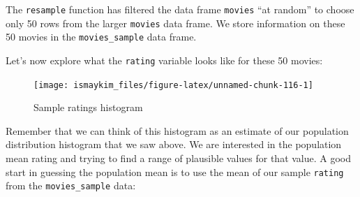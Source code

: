\documentclass[]{tufte-book}
\newenvironment{Shaded}{\begin{snugshade}}{\end{snugshade}}
\newcommand{\KeywordTok}[1]{\textcolor[rgb]{0.13,0.29,0.53}{\textbf{{#1}}}}
\newcommand{\DataTypeTok}[1]{\textcolor[rgb]{0.13,0.29,0.53}{{#1}}}
\newcommand{\DecValTok}[1]{\textcolor[rgb]{0.00,0.00,0.81}{{#1}}}
\newcommand{\StringTok}[1]{\textcolor[rgb]{0.31,0.60,0.02}{{#1}}}
\newcommand{\OtherTok}[1]{\textcolor[rgb]{0.56,0.35,0.01}{{#1}}}
\newcommand{\NormalTok}[1]{{#1}}
\begin{document}
\begin{Shaded}
\end{Shaded}

The \texttt{resample} function has filtered the data frame
\texttt{movies} ``at random'' to choose only 50 rows from the larger
\texttt{movies} data frame. We store information on these 50 movies in
the \texttt{movies\_sample} data frame.

Let's now explore what the \texttt{rating} variable looks like for these
50 movies:

\begin{Shaded}
\end{Shaded}

\begin{figure}

{\centering \texttt{[image: ismaykim\_files/figure-latex/unnamed-chunk-116-1]} 

}

\caption[Sample ratings histogram]{Sample ratings histogram}\label{fig:unnamed-chunk-116}
\end{figure}

Remember that we can think of this histogram as an estimate of our
population distribution histogram that we saw above. We are interested
in the population mean rating and trying to find a range of plausible
values for that value. A good start in guessing the population mean is
to use the mean of our sample \texttt{rating} from the
\texttt{movies\_sample} data:

\begin{Shaded}
\end{Shaded}
\end{document}
